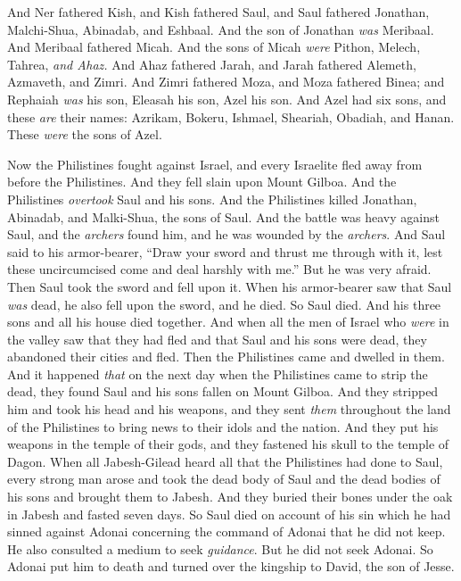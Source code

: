 \begin{biblechapter}
\verse And Ner fathered Kish, and Kish fathered Saul, and Saul fathered Jonathan, Malchi-Shua, Abinadab, and Eshbaal.
\verse And the son of Jonathan \textit{was} Meribaal. And Meribaal fathered Micah.
\verse And the sons of Micah \textit{were} Pithon, Melech, Tahrea, \textit{and Ahaz.}
\verse And Ahaz fathered Jarah, and Jarah fathered Alemeth, Azmaveth, and Zimri. And Zimri fathered Moza,
\verse and Moza fathered Binea; and Rephaiah \textit{was} his son, Eleasah his son, Azel his son.
\verse And Azel had six sons, and these \textit{are} their names: Azrikam, Bokeru, Ishmael, Sheariah, Obadiah, and Hanan. These \textit{were} the sons of Azel.
\end{biblechapter}

\begin{biblechapter} %
 Now the Philistines fought against Israel, and every Israelite fled away from before the Philistines. And they fell slain upon Mount Gilboa.
\verse And the Philistines \textit{overtook} Saul and his sons. And the Philistines killed Jonathan, Abinadab, and Malki-Shua, the sons of Saul.
\verse And the battle was heavy against Saul, and the \textit{archers} found him, and he was wounded by the \textit{archers}.
\verse And Saul said to his armor-bearer, “Draw your sword and thrust me through with it, lest these uncircumcised come and deal harshly with me.” But he was very afraid. Then Saul took the sword and fell upon it.
\verse When his armor-bearer saw that Saul \textit{was} dead, he also fell upon the sword, and he died.
\verse So Saul died. And his three sons and all his house died together.
\verse And when all the men of Israel who \textit{were} in the valley saw that they had fled and that Saul and his sons were dead, they abandoned their cities and fled. Then the Philistines came and dwelled in them.
\verse And it happened \textit{that} on the next day when the Philistines came to strip the dead, they found Saul and his sons fallen on Mount Gilboa.
\verse And they stripped him and took his head and his weapons, and they sent \textit{them} throughout the land of the Philistines to bring news to their idols and the nation.
\verse And they put his weapons in the temple of their gods, and they fastened his skull to the temple of Dagon.
\verse When all Jabesh-Gilead heard all that the Philistines had done to Saul,
\verse every strong man arose and took the dead body of Saul and the dead bodies of his sons and brought them to Jabesh. And they buried their bones under the oak in Jabesh and fasted seven days.
\verse So Saul died on account of his sin which he had sinned against Adonai concerning the command of Adonai that he did not keep. He also consulted a medium to seek \textit{guidance}.
\verse But he did not seek Adonai. So Adonai put him to death and turned over the kingship to David, the son of Jesse.
\end{biblechapter}

